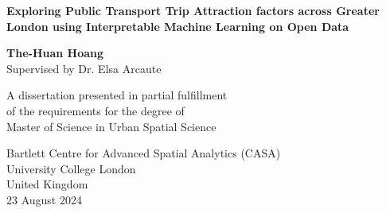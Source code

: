 \begin{titlepage}
    \begin{center}
        \vspace*{5cm}
 
        \textbf{\LARGE{Exploring Public Transport Trip Attraction factors across Greater London using Interpretable Machine Learning on Open Data}}     
             
        \vspace{4cm}
 
        \textbf{The-Huan Hoang}\\
        Supervised by Dr. Elsa Arcaute
 
        \vfill
             
        A dissertation presented in partial fulfillment \\
        of the requirements for the degree of\\
        Master of Science in Urban Spatial Science
             
        \vspace{1cm}
                 
        Bartlett Centre for Advanced Spatial Analytics (CASA) \\
        University College London\\
        United Kingdom\\
        23 August 2024
             
    \end{center}
 \end{titlepage}